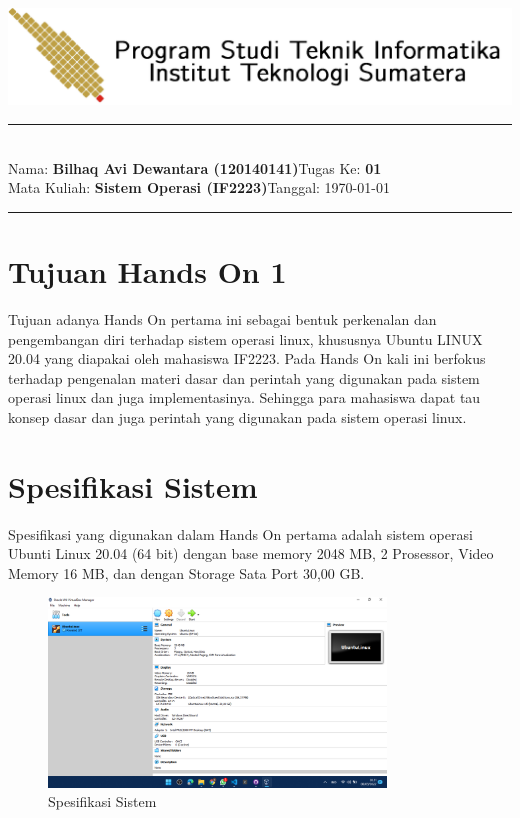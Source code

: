 \documentclass[11pt,a4paper]{article}
\newcommand{\stuid}{120140141}
\newcommand{\student}{\textbf{Bilhaq Avi Dewantara (\stuid{})}}
\newcommand{\course}{\textbf{Sistem Operasi (IF2223)}}
\newcommand{\assignment}{\textbf{01}} %
\begin{document}
\thispagestyle{empty}
\begin{center}
	\includegraphics[scale = 0.15]{Figure/ifitera-header.png}
	\vspace{0.1cm}
\end{center}
\noindent
{\large
\rule{17cm}{0.2cm}\\[0.3cm]
Nama: \student \hfill Tugas Ke: \assignment\\[0.1cm]
Mata Kuliah: \course \hfill Tanggal: \today\\
\rule{17cm}{0.05cm}
\vspace{0.1cm}
}


\section{Tujuan Hands On 1}
    Tujuan adanya Hands On pertama ini sebagai bentuk perkenalan dan pengembangan diri terhadap sistem operasi linux, 
	khususnya Ubuntu LINUX 20.04 yang diapakai oleh mahasiswa IF2223. Pada Hands On kali ini berfokus terhadap pengenalan 
	materi dasar dan perintah yang digunakan pada sistem operasi linux dan juga implementasinya. Sehingga para mahasiswa 
	dapat tau konsep dasar dan juga perintah yang digunakan pada sistem operasi linux.

\section{Spesifikasi Sistem}
    Spesifikasi yang digunakan dalam Hands On pertama adalah sistem operasi Ubunti Linux 20.04 (64 bit) dengan base memory 2048 MB, 
	2 Prosessor, Video Memory 16 MB, dan dengan Storage Sata Port 30,00 GB.
	\begin{figure}[h]
		\centering
		\includegraphics[width=0.8\textwidth]{Figure/Spek Sistem.png}
		\caption{Spesifikasi Sistem}
	\end{figure}
\end{document}
